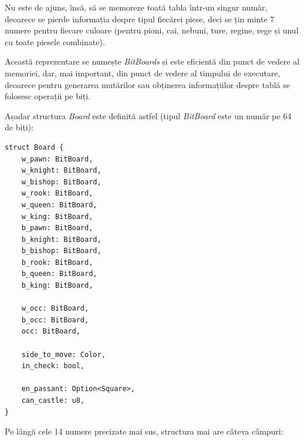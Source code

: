 Nu este de ajuns, însă, să se memoreze toată tabla într-un singur număr, deoarece se pierde informația
despre tipul fiecărei piese, deci se țin minte 7 numere pentru fiecare culoare (pentru pioni, cai,
nebuni, ture, regine, rege și unul cu toate piesele combinate).

Această reprezentare se numește \textit{BitBoards} și este eficientă din punct de vedere al memoriei, dar, mai important, din punct
de vedere al timpului de executare, deoarece pentru generarea mutărilor sau obținerea informațiilor
despre tablă se folosesc operații pe biți.
\vspace{0.5cm}

Așadar structura \textit{Board} este definită astfel
(tipul \textit{BitBoard} este un număr pe 64 de biți):
\begin{lstlisting}[language=RustHtml]
struct Board {
    w_pawn: BitBoard,
    w_knight: BitBoard,
    w_bishop: BitBoard,
    w_rook: BitBoard,
    w_queen: BitBoard,
    w_king: BitBoard,
    b_pawn: BitBoard,
    b_knight: BitBoard,
    b_bishop: BitBoard,
    b_rook: BitBoard,
    b_queen: BitBoard,
    b_king: BitBoard,

    w_occ: BitBoard,
    b_occ: BitBoard,
    occ: BitBoard,

    side_to_move: Color,
    in_check: bool,

    en_passant: Option<Square>,
    can_castle: u8,
}
\end{lstlisting}
Pe lângă cele 14 numere precizate mai sus, structura mai are câteva câmpuri:
